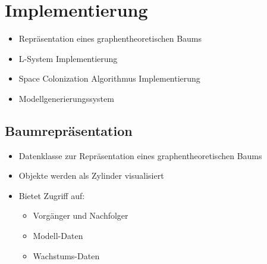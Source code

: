 
\newpage
\slidetitle{}
\section{Implementierung\\}
\begin{itemize}
	\item Repräsentation eines graphentheoretischen Baums\\
	
	\item L-System Implementierung\\
	
	\item Space Colonization Algorithmus Implementierung\\
	
	\item Modellgenerierungssystem
\end{itemize}






\newpage
{}
\subsection{Baumrepräsentation\\}
\begin{itemize}
	
	\item Datenklasse zur Repräsentation eines graphentheoretischen Baums \\
	
	\item Objekte werden als Zylinder visualisiert\\
	
	\item Bietet Zugriff auf:
	\begin{itemize}
		\item Vorgänger und Nachfolger\\
		
		\item Modell-Daten\\
		
		\item Wachstums-Daten
	\end{itemize}
\end{itemize}





\newpage
\slidetitle{}
